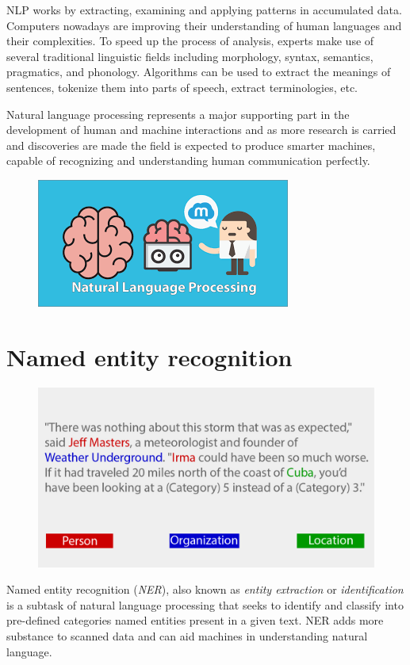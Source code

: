 \documentclass{report}
\begin{document}
NLP works by extracting, examining and applying patterns in accumulated data. Computers nowadays are improving their understanding of human languages and their complexities. To speed up the process of analysis, experts make use of several traditional linguistic fields including morphology, syntax, semantics, pragmatics, and phonology. Algorithms can be used to extract the meanings of sentences, tokenize them into parts of speech, extract terminologies, etc. \par

Natural language processing represents a major supporting part in the development of human and machine interactions and as more research is carried and discoveries are made the field is expected to produce smarter machines, capable of recognizing and understanding human communication perfectly.
\begin{figure}[h]
\vspace{2cm}
\centerline{\includegraphics[scale=0.8]{nlp2}}
\end{figure}


\section{Named entity recognition}
\begin{figure}[b]
\centerline{\includegraphics[scale=0.55]{ner}}
\end{figure}
Named entity recognition (\textit{NER}), also known as \textit{entity extraction} or \textit{identification} is a subtask of natural language processing that seeks to identify and classify into pre-defined categories named entities present in a given text. NER adds more substance to scanned data and can aid machines in understanding natural language. \par
\end{document}
